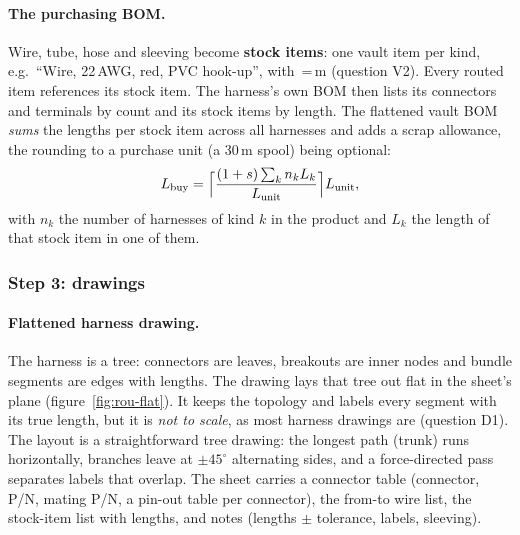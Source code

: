 \paragraph{The purchasing BOM.} Wire, tube, hose and sleeving become \textbf{stock items}: one vault item per
kind, e.g.\ ``Wire, 22\,AWG, red, PVC hook-up'', with \,=\,m (question V2). Every routed
item references its stock item. The harness's own BOM then lists its connectors and terminals by count and
its stock items by length. The flattened vault BOM \emph{sums} the lengths per stock item across all harnesses
and adds a scrap allowance, the rounding to a purchase unit (a 30\,m spool) being optional:
\[
  L_{\text{buy}}=\Bigl\lceil \frac{(1+s)\sum_k n_k L_k}{L_{\text{unit}}}\Bigr\rceil L_{\text{unit}},
\]
with $n_k$ the number of harnesses of kind $k$ in the product and $L_k$ the length of that stock item in one
of them.

\subsubsection*{Step 3: drawings}

\paragraph{Flattened harness drawing.} The harness is a tree: connectors are leaves, breakouts are inner
nodes and bundle segments are edges with lengths. The drawing lays that tree out flat in the sheet's plane
(figure~\ref{fig:rou-flat}). It keeps the topology and labels every segment with its true length, but it is
\emph{not to scale}, as most harness drawings are (question D1). The layout is a straightforward tree drawing:
the longest path (trunk) runs horizontally, branches leave at $\pm45^\circ$ alternating sides, and a
force-directed pass separates labels that overlap. The sheet carries a connector table (connector, P/N,
mating P/N, a pin-out table per connector), the from-to wire list, the stock-item list with lengths, and
notes (lengths $\pm$ tolerance, labels, sleeving).

